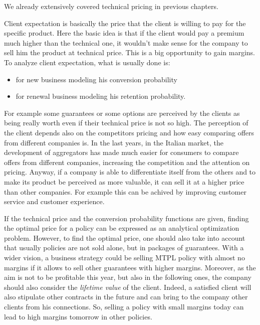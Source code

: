 \documentclass[a4paper, nobind]{templates/ociamthesis}
\providecommand{\tightlist}{%
  \setlength{\itemsep}{0pt}\setlength{\parskip}{0pt}}
\theoremstyle{definition}
\theoremstyle{definition}
\theoremstyle{definition}
\theoremstyle{remark}
\begin{document}
We already extensively covered technical pricing in previous chapters.

Client expectation is basically the price that the client is willing to pay for the specific product. Here the basic idea is that if the client would pay a premium much higher than the technical one, it wouldn't make sense for the company to sell him the product at technical price. This is a big opportunity to gain margins. To analyze client expectation, what is usually done is:

\begin{itemize}
\tightlist
\item
  for new business modeling his conversion probability
\item
  for renewal business modeling his retention probability.
\end{itemize}

For example some guarantees or some options are perceived by the clients as being really worth even if their technical price is not so high. The perception of the client depends also on the competitors pricing and how easy comparing offers from different companies is. In the last years, in the Italian market, the development of aggregators has made much easier for consumers to compare offers from different companies, increasing the competition and the attention on pricing. Anyway, if a company is able to differentiate itself from the others and to make its product be perceived as more valuable, it can sell it at a higher price than other companies. For example this can be achived by improving customer service and customer experience.

If the technical price and the conversion probability functions are given, finding the optimal price for a policy can be expressed as an analytical optimization problem. However, to find the optimal price, one should also take into account that usually policies are not sold alone, but in packages of guarantees. With a wider vision, a business strategy could be selling MTPL policy with almost no margins if it allows to sell other guarantees with higher margins. Moreover, as the aim is not to be profitable this year, but also in the following ones, the company should also consider the \emph{lifetime value} of the client. Indeed, a satisfied client will also stipulate other contracts in the future and can bring to the company other clients from his connections. So, selling a policy with small margins today can lead to high margins tomorrow in other policies.
\end{document}
